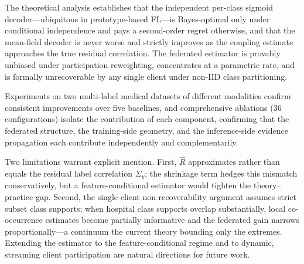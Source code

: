 \documentclass[conference]{IEEEtran}
\theoremstyle{definition}
\newcommand{\Rhat}{\widehat{R}}
\newcommand{\Sigmay}{\Sigma_{y}}
\begin{document}
The theoretical analysis establishes that the independent per-class sigmoid decoder---ubiquitous in prototype-based FL---is Bayes-optimal only under conditional independence and pays a second-order regret otherwise, and that the mean-field decoder is never worse and strictly improves as the coupling estimate approaches the true residual correlation. The federated estimator is provably unbiased under participation reweighting, concentrates at a parametric rate, and is formally unrecoverable by any single client under non-IID class partitioning.

Experiments on two multi-label medical datasets of different modalities confirm consistent improvements over five baselines, and comprehensive ablations (36 configurations) isolate the contribution of each component, confirming that the federated structure, the training-side geometry, and the inference-side evidence propagation each contribute independently and complementarily.

Two limitations warrant explicit mention. First, $\Rhat$ approximates rather than equals the residual label correlation $\Sigmay$; the shrinkage term hedges this mismatch conservatively, but a feature-conditional estimator would tighten the theory--practice gap. Second, the single-client non-recoverability argument assumes strict subset class supports; when hospital class supports overlap substantially, local co-occurrence estimates become partially informative and the federated gain narrows proportionally---a continuum the current theory bounding only the extremes. Extending the estimator to the feature-conditional regime and to dynamic, streaming client participation are natural directions for future work.



\end{document}
